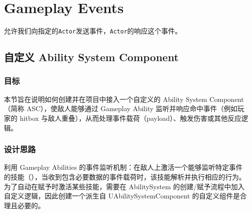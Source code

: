 \documentclass[10pt,CJKmath]{zhbook-v1}
\newcommand{\il}[1]{\texttt{#1}}%
\begin{document}
\chapter{Gameplay Events}
允许我们向指定的\il{Actor}发送事件，\il{Actor}的响应这个事件。

\section{自定义 Ability System Component}

\subsection{目标}
本节旨在说明如何创建并在项目中接入一个自定义的 Ability System Component（简称 ASC），使敌人能够通过 Gameplay Ability 监听并响应命中事件（例如玩家的 hitbox 与敌人重叠），从而处理事件载荷（payload）、触发伤害或其他反应逻辑。

\subsection{设计思路}
利用 Gameplay Abilities 的事件监听机制：在敌人上激活一个能够监听特定事件的技能（），当收到包含必要数据的事件载荷时，该技能解析并执行相应的行为。为了自动在赋予时激活某些技能，需要在 AbilitySystem 的创建/赋予流程中加入自定义逻辑，因此创建一个派生自 UAbilitySystemComponent 的自定义组件是合理且必要的。
\end{document}
